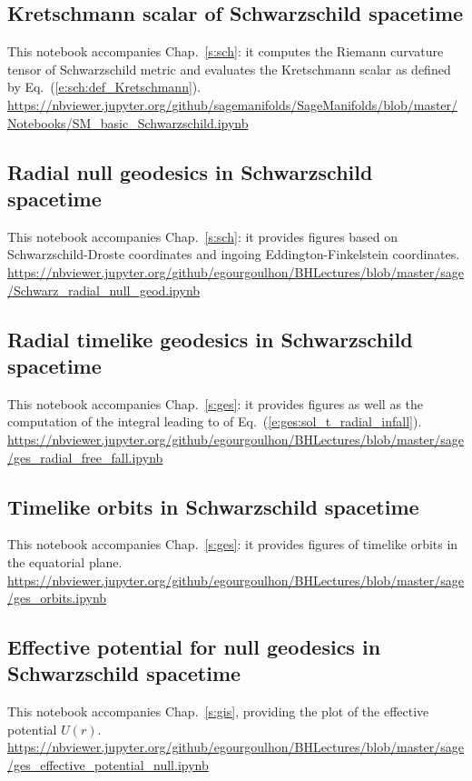 \subsection{Kretschmann scalar of Schwarzschild spacetime} \label{s:sam:Kretschmann_Schwarz}

This notebook accompanies Chap.~\ref{s:sch}: it computes the Riemann curvature
tensor of Schwarzschild metric and evaluates the Kretschmann scalar as defined
by Eq.~(\ref{e:sch:def_Kretschmann}). \\[1ex]
{\footnotesize
\url{https://nbviewer.jupyter.org/github/sagemanifolds/SageManifolds/blob/master/Notebooks/SM_basic_Schwarzschild.ipynb}
}

\subsection{Radial null geodesics in Schwarzschild spacetime}

This notebook accompanies Chap.~\ref{s:sch}: it provides figures based on
Schwarzschild-Droste coordinates and ingoing Eddington-Finkelstein coordinates.\\[1ex]
{\footnotesize
\url{https://nbviewer.jupyter.org/github/egourgoulhon/BHLectures/blob/master/sage/Schwarz_radial_null_geod.ipynb}
}

\subsection{Radial timelike geodesics in Schwarzschild spacetime} \label{s:sam:ges_radial_free_fall}

This notebook accompanies Chap.~\ref{s:ges}: it provides
figures as well as the computation of
the integral leading to
of Eq.~(\ref{e:ges:sol_t_radial_infall}).\\[1ex]
{\footnotesize
\url{https://nbviewer.jupyter.org/github/egourgoulhon/BHLectures/blob/master/sage/ges_radial_free_fall.ipynb}
}

\subsection{Timelike orbits in Schwarzschild spacetime} \label{s:sam:ges_orbits}
%
This notebook accompanies Chap.~\ref{s:ges}: it provides
figures of timelike orbits in the equatorial plane.\\[1ex]
{\footnotesize
\url{https://nbviewer.jupyter.org/github/egourgoulhon/BHLectures/blob/master/sage/ges_orbits.ipynb}
}

\subsection{Effective potential for null geodesics in Schwarzschild spacetime} \label{s:sam:ges_eff_pot_null}
%
This notebook accompanies Chap.~\ref{s:gis}, providing the plot of the
effective potential $U(r)$.\\[1ex]
{\footnotesize
\url{https://nbviewer.jupyter.org/github/egourgoulhon/BHLectures/blob/master/sage/ges_effective_potential_null.ipynb}
}

